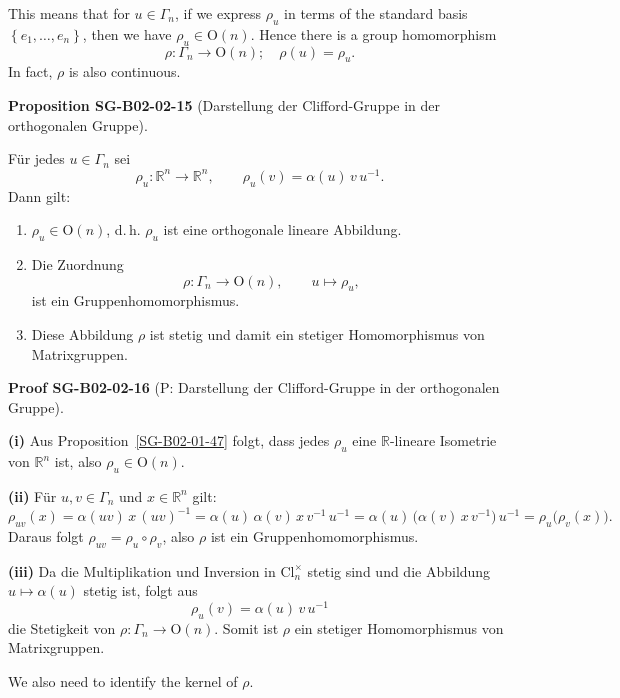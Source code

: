 \documentclass[10pt, letterpaper]{article}
\newcommand{\R}{\mathbb{R}}
\newcommand{\Cl}{\mathrm{Cl}}
\newcommand{\CustomHeading}[3]{%
  \par\medskip\noindent%
  \textbf{#1 #2} \textnormal{(#3)}.\enskip%
}
\newenvironment{PROP}[2]{\begin{unitbox}\CustomHeading{Proposition}{#1}{#2}}{\end{unitbox}}
\newenvironment{PROOF}[2]{\begin{unitbox}\CustomHeading{Proof}{#1}{#2}}{\end{unitbox}}
\begin{document}
This means that for $u \in \Gamma_{n}$, if we express $\rho_{u}$ in terms of the standard basis $\left\{e_{1}, \ldots, e_{n}\right\}$, then we have $\rho_{u} \in \mathrm{O}(n)$. Hence there is a group homomorphism
$$
\rho: \Gamma_{n} \longrightarrow \mathrm{O}(n) ; \quad \rho(u)=\rho_{u} .
$$
In fact, $\rho$ is also continuous. 


\begin{PROP}{SG-B02-02-15}{Darstellung der Clifford-Gruppe in der orthogonalen Gruppe}
Für jedes \(u \in \Gamma_n\) sei
\[
\rho_u : \R^n \longrightarrow \R^n, \qquad \rho_u(v) = \alpha(u)\, v\, u^{-1}.
\]
Dann gilt:

\begin{enumerate}[label=(\roman*)]
\item \(\rho_u \in \mathrm{O}(n)\), d.\,h. \(\rho_u\) ist eine orthogonale lineare Abbildung.
\item Die Zuordnung
\[
\rho : \Gamma_n \longrightarrow \mathrm{O}(n), \qquad u \longmapsto \rho_u,
\]
ist ein Gruppenhomomorphismus.
\item Diese Abbildung \(\rho\) ist stetig und damit ein stetiger Homomorphismus von Matrixgruppen.
\end{enumerate}
\end{PROP}



\begin{PROOF}{SG-B02-02-16}{P: Darstellung der Clifford-Gruppe in der orthogonalen Gruppe}
\textbf{(i)}  
Aus Proposition~\ref{SG-B02-01-47} folgt, dass jedes \(\rho_u\) eine \(\R\)-lineare Isometrie von \(\R^n\) ist, also \(\rho_u \in \mathrm{O}(n)\).

\textbf{(ii)}  
Für \(u,v \in \Gamma_n\) und \(x \in \R^n\) gilt:
\[
\rho_{uv}(x)
= \alpha(uv)\, x\, (uv)^{-1}
= \alpha(u)\,\alpha(v)\, x\, v^{-1}\, u^{-1}
= \alpha(u)\, \big(\alpha(v)\, x\, v^{-1}\big)\, u^{-1}
= \rho_u\big(\rho_v(x)\big).
\]
Daraus folgt \(\rho_{uv} = \rho_u \circ \rho_v\), also \(\rho\) ist ein Gruppenhomomorphismus.

\textbf{(iii)}  
Da die Multiplikation und Inversion in \(\Cl_n^\times\) stetig sind und die Abbildung \(u \mapsto \alpha(u)\) stetig ist, folgt aus
\[
\rho_u(v) = \alpha(u)\, v\, u^{-1}
\]
die Stetigkeit von \(\rho: \Gamma_n \to \mathrm{O}(n)\).
Somit ist \(\rho\) ein stetiger Homomorphismus von Matrixgruppen.
\end{PROOF}




We also need to identify the kernel of $\rho$.
\end{document}
